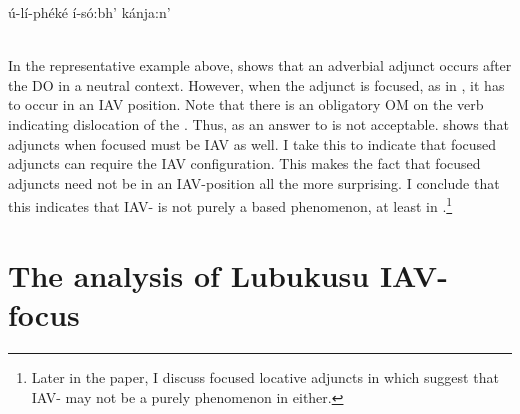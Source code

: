 \documentclass[output=paper,newtxmath,modfonts,nonflat,hidelinks]{langsci/langscibook}
\begin{document}
\ex\label{ex:selvanathan:12c}
	{\gll *ú-lí-phéké     í-só:bh’  kánja:n’     \\
	\\	}
\z
\z

In the representative example above,  shows that an adverbial adjunct occurs after the DO in a neutral context. However, when the adjunct is focused, as in , it has to occur in an IAV position. Note that there is an obligatory OM on the verb indicating dislocation of the . Thus,  as an answer to  is not acceptable.  shows that  adjuncts when focused must be IAV as well. I take this to indicate that focused adjuncts can require the IAV configuration. This makes the fact that  focused adjuncts need not be in an IAV-position all the more surprising. I conclude that this indicates that IAV- is not purely a  based phenomenon, at least in .\footnote{Later in the paper, I discuss focused locative adjuncts in  which suggest that IAV- may not be a purely  phenomenon in  either.}  

\section{The analysis of Lubukusu IAV-focus}\label{sec:selvanathan:5}
\end{document}
